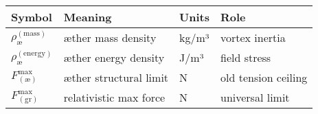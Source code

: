 \begin{table}
    \centering
    \begin{tabular}{llll}
        \toprule
        \textbf{Symbol} & \textbf{Meaning} & \textbf{Units} & \textbf{Role} \\
        \midrule
        $\rho_{\text{æ}}^{(\mathrm{mass})}$ & æther mass density & kg/m³ & vortex inertia \\
        $\rho_{\text{æ}}^{(\mathrm{energy})}$& æther energy density & J/m³ & field stress \\
        $F^{\max}_{(\text{æ})}$             & æther structural limit & N & old tension ceiling \\
        $F^{\max}_{(\mathrm{gr})}$         & relativistic max force & N & universal limit \\
        \bottomrule
    \end{tabular}
    \caption{}
    \label{tab:}
\end{table}


    \medskip

